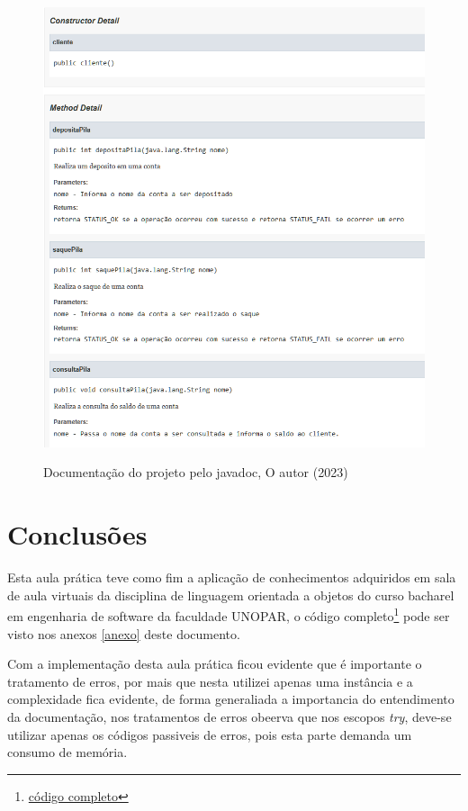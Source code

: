 \begin{figure}[H]
  \centering
  \includegraphics[width=\textwidth]{figure/java_doc.png}
  \label{fig:javadoc}
  \caption{Documentação do projeto pelo javadoc, O autor (2023)}
\end{figure}

\section{Conclusões}

\par Esta aula prática teve como fim a aplicação de conhecimentos adquiridos em sala de aula virtuais da disciplina de linguagem orientada a objetos do curso bacharel em engenharia de software da faculdade UNOPAR, o código completo\footnote{\hyperref[anexo]{código completo}}  pode ser visto nos anexos \ref{anexo} deste documento.
\par Com a implementação desta aula prática ficou evidente que é importante o tratamento de erros, por mais que nesta utilizei apenas uma instância e a complexidade fica evidente, de forma generaliada a importancia do entendimento da documentação, nos tratamentos de erros obeerva que nos escopos \textit{try}, deve-se utilizar apenas os códigos passiveis de erros, pois esta parte demanda um consumo de memória.

